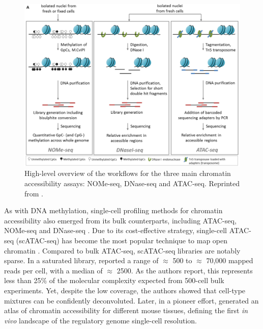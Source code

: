 \begin{figure}[H]
	\centering
	\includegraphics[width=0.75\linewidth]{ChromatinAcc_protocols}
	\caption[]{High-level overview of the workflows for the three main chromatin accessibility assays: NOMe-seq, DNase-seq and ATAC-seq. Reprinted from \cite{Nordstrom2019}.}
	\label{fig:ChromatinAcc_protocols}
\end{figure}

As with DNA methylation, single-cell profiling methods for chromatin accessibility also emerged from its bulk counterparts, including ATAC-seq\cite{Buenrostro2015a}, NOMe-seq \cite{Pott2016} and DNase-seq \cite{Jin2015}. Due to its cost-effective strategy, single-cell ATAC-seq (scATAC-seq) has become the most popular technique to map open chromatin \cite{Cusanovich2015,Cao2018,Chen2018}. Compared to bulk ATAC-seq, scATAC-seq libraries are notably sparse. In a saturated library, \cite{Cusanovich2015} reported a range of $\approx$ 500 to $\approx$ 70,000 mapped reads per cell, with a median of $\approx$ 2500. As the authors report, this represents less than 25\% of the molecular complexity expected from 500-cell bulk experiments. Yet, despite the low coverage, the authors showed that cell-type mixtures can be confidently deconvoluted. Later, in a pioneer effort, \cite{Cusanovich2018b} generated an atlas of chromatin accessibility for different mouse tissues, defining the first \textit{in vivo} landscape of the regulatory genome single-cell resolution.



